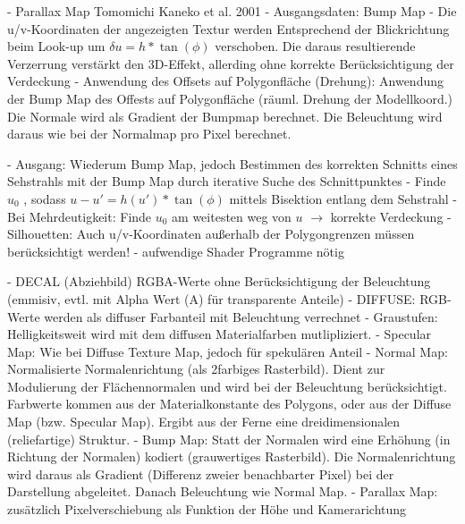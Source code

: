 \documentclass[10pt,landscape]{article}
\begin{document}
\begin{multicols}{3}
  - Parallax Map Tomomichi Kaneko et al. 2001
  - Ausgangsdaten: Bump Map
  - Die u/v-Koordinaten der angezeigten Textur werden Entsprechend der Blickrichtung beim Look-up um $\delta u = h * \tan(\phi)$ verschoben. Die daraus resultierende Verzerrung verstärkt den 3D-Effekt, allerding ohne korrekte Berücksichtigung der Verdeckung
  - Anwendung des Offsets auf Polygonfläche (Drehung): Anwendung der Bump Map des Offests auf Polygonfläche (räuml. Drehung der Modellkoord.) Die Normale wird als Gradient der Bumpmap berechnet. Die Beleuchtung wird daraus wie bei der Normalmap pro Pixel berechnet.
  
  - Ausgang: Wiederum Bump Map, jedoch Bestimmen des korrekten Schnitts eines Sehstrahls mit der Bump Map durch iterative Suche des Schnittpunktes
  - Finde $u_0$ , sodass $u-u' = h(u') * \tan(\phi)$ mittels Bisektion entlang dem Sehstrahl
  - Bei Mehrdeutigkeit: Finde $u_0$ am weitesten weg von $u$ $\rightarrow$ korrekte Verdeckung
  - Silhouetten: Auch u/v-Koordinaten außerhalb der Polygongrenzen müssen berücksichtigt werden!
  - aufwendige Shader Programme nötig
  
  - DECAL (Abziehbild) RGBA-Werte ohne Berücksichtigung der Beleuchtung (emmisiv, evtl. mit Alpha Wert (A) für transparente Anteile)
  - DIFFUSE: RGB-Werte werden als diffuser Farbanteil mit Beleuchtung verrechnet
  - Graustufen: Helligkeitsweit wird mit dem diffusen Materialfarben mutlipliziert.
  - Specular Map: Wie bei Diffuse Texture Map, jedoch für spekulären Anteil
  - Normal Map: Normalisierte Normalenrichtung (als 2farbiges Rasterbild). Dient zur Modulierung der Flächennormalen und wird bei der Beleuchtung berücksichtigt. Farbwerte kommen aus der Materialkonstante des Polygons, oder aus der Diffuse Map (bzw. Specular Map). Ergibt aus der Ferne eine dreidimensionalen (reliefartige) Struktur.
  - Bump Map: Statt der Normalen wird eine Erhöhung (in Richtung der Normalen) kodiert (grauwertiges Rasterbild). Die Normalenrichtung wird daraus als Gradient (Differenz zweier benachbarter Pixel) bei der Darstellung abgeleitet. Danach Beleuchtung wie Normal Map.
  - Parallax Map: zusätzlich Pixelverschiebung als Funktion der Höhe und Kamerarichtung
  

\end{multicols}
\end{document}
